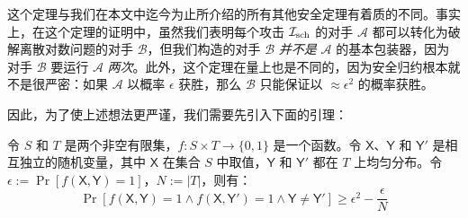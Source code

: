 这个定理与我们在本文中迄今为止所介绍的所有其他安全定理有着质的不同。事实上，在这个定理的证明中，虽然我们表明每个攻击 $\mathcal{I}_{\rm sch}$ 的对手 $\mathcal{A}$ 都可以转化为破解离散对数问题的对手 $\mathcal{B}$，但我们构造的对手 $\mathcal{B}$ \emph{并不是} $\mathcal{A}$ 的基本包装器，因为对手 $\mathcal{B}$ 要运行 $\mathcal{A}$ \emph{两次}。此外，这个定理在量上也是不同的，因为安全归约根本就不是很严密：如果 $\mathcal{A}$ 以概率 $\epsilon$ 获胜，那么 $\mathcal{B}$ 只能保证以 $\approx\epsilon^2$ 的概率获胜。

因此，为了使上述想法更严谨，我们需要先引入下面的引理：

\begin{lemma}[回溯引理]\label{theo:19-2}
令 $S$ 和 $T$ 是两个非空有限集，$f:S\times T\to\{0,1\}$ 是一个函数。令 $\mathsf{X}$、$\mathsf{Y}$ 和 $\mathsf{Y}'$ 是相互独立的随机变量，其中 $\mathsf{X}$ 在集合 $S$ 中取值，$\mathsf{Y}$ 和 $\mathsf{Y}'$ 都在 $T$ 上均匀分布。令 $\epsilon:=\Pr[f(\mathsf{X},\mathsf{Y})=1]$，$N:=|T|$，则有：
\[
\Pr[f(\mathsf{X},\mathsf{Y})=1\land f(\mathsf{X},\mathsf{Y}')=1\land \mathsf{Y}\neq\mathsf{Y}']\geq\epsilon^2-\frac{\epsilon}{N}
\]
\end{lemma}

